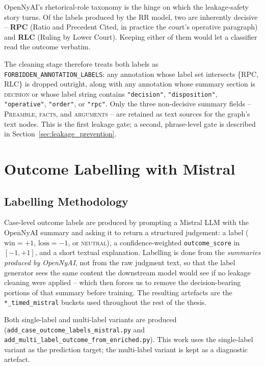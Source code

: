 OpenNyAI's rhetorical-role taxonomy is the hinge on which the
leakage-safety story turns. Of the labels produced by the RR model, two
are inherently decisive -- \textbf{RPC} (Ratio and Precedent Cited, in
practice the court's operative paragraph) and \textbf{RLC} (Ruling by
Lower Court). Keeping either of them would let a classifier read the
outcome verbatim.

The cleaning stage therefore treats both labels as
\texttt{FORBIDDEN\_ANNOTATION\_LABELS}: any annotation whose label set
intersects \{\textsc{RPC}, \textsc{RLC}\} is dropped outright, along
with any annotation whose summary section is \textsc{decision} or whose
label string contains \texttt{"decision"}, \texttt{"disposition"},
\texttt{"operative"}, \texttt{"order"}, or \texttt{"rpc"}. Only the
three non-decisive summary fields -- \textsc{Preamble},
\textsc{facts}, and \textsc{arguments} -- are retained as text sources
for the graph's text nodes. This is the first leakage gate; a second,
phrase-level gate is described in Section~\ref{sec:leakage_prevention}.

\section{Outcome Labelling with Mistral}

\subsection{Labelling Methodology}

Case-level outcome labels are produced by prompting a Mistral LLM with
the OpenNyAI summary and asking it to return a structured judgement:
a label ($\text{win} = +1$, $\text{loss} = -1$, or \textsc{neutral}),
a confidence-weighted \texttt{outcome\_score} in $[-1, +1]$, and a short
textual explanation. Labelling is done from the \emph{summaries
produced by OpenNyAI}, not from the raw judgment text, so that the
label generator sees the same content the downstream model would see
if no leakage cleaning were applied -- which then forces us to remove
the decision-bearing portions of that summary before training. The
resulting artefacts are the \texttt{*\_timed\_mistral} buckets used
throughout the rest of the thesis.

Both single-label and multi-label variants are produced
(\texttt{add\_case\_outcome\_labels\_mistral.py} and
\texttt{add\_multi\_label\_outcome\_from\_enriched.py}). This work uses
the single-label variant as the prediction target; the multi-label
variant is kept as a diagnostic artefact.

